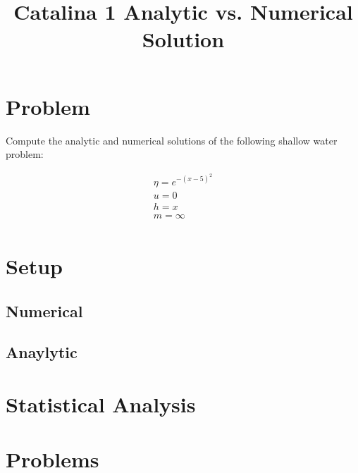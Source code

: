 \documentclass{article}
\title{Catalina 1 Analytic vs. Numerical Solution}
\begin{document}
\maketitle

\section{Problem}

Compute the analytic and numerical solutions of the following shallow water problem:

\[
\begin{aligned}
\eta = e^{-(x-5)^2} \\
u = 0 \\
h = x \\
m = \infty  \\
\end{aligned}
\]


\section{Setup}

\subsection{Numerical}

\subsection{Anaylytic}

\section{Statistical Analysis}

\section{Problems}
\end{document}
